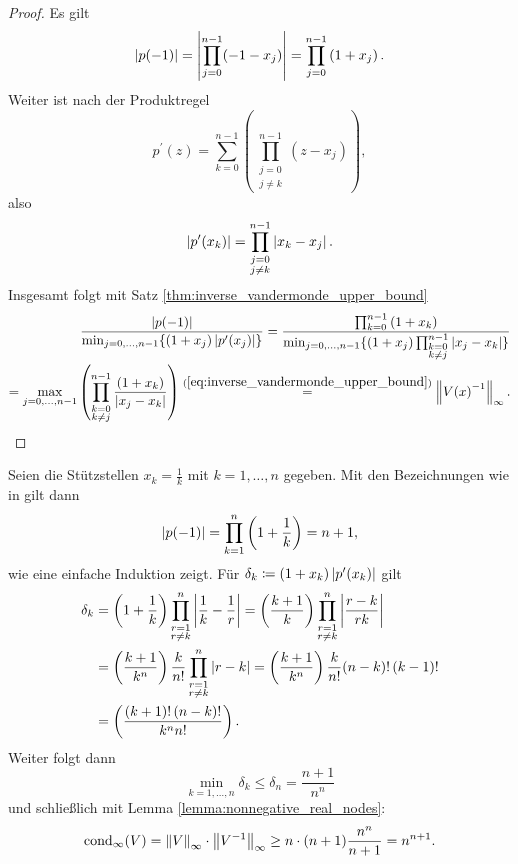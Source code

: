 \begin{proof}
    Es gilt
    \[
        \abs{p(-1)} = \abs{\prod_{j=0}^{n-1} (-1 - x_j)} = \prod_{j=0}^{n-1} \left( 1 + x_j \right).
    \]
    Weiter ist nach der Produktregel
    \[
        p^{\prime}(z) = \sum_{k=0}^{n-1} \left( \prod_{\substack{j=0\\ j\neq k}}^{n-1} \left( z - x_j \right) \right),
    \]
    also
    \[
        \abs{p^{\prime}(x_k)} = \prod_{\substack{j=0\\ j\neq k}}^{n-1} \abs{ x_k - x_j }.
    \]
    Insgesamt folgt mit Satz \ref{thm:inverse_vandermonde_upper_bound}
    \[
        \begin{split}
            \frac{ \abs{p(-1)}}{\min_{j=0, \dots, n-1} \{ (1+x_j) \abs{p^{\prime}(x_j)} \}}
            = \frac{\prod_{k=0}^{n-1} \left( 1 + x_k \right)}{\min_{j=0, \dots, n-1} \{ (1+x_j) \prod_{\substack{k=0\\ k\neq j}}^{n-1} \abs{ x_j - x_k }\}}\\
            = \max_{j=0, \dots, n-1} \left( \prod_{\substack{k=0\\ k \neq j}}^{n-1} \frac{\left( 1 + x_k \right)}{\abs{ x_j - x_k }} \right)
            \overset{(\ref{eq:inverse_vandermonde_upper_bound})}{=} \norm{\Vand{x}^{-1}}_{\infty}.
        \end{split}
    \]
\end{proof}

\begin{example}
    Seien die Stützstellen $x_k = \frac{1}{k}$ mit $k=1, \dots, n$ gegeben.
    Mit den Bezeichnungen wie in  gilt dann
    \[
        \abs{p(-1)} = \prod_{k=1}^{n} \left( 1 + \frac{1}{k} \right) = n+1,
    \]
    wie eine einfache Induktion zeigt.
    Für $\delta_k \defeq (1 + x_k) \abs{ p^{\prime}(x_k) }$ gilt
    \[
        \begin{split}
            \delta_k &= \left( 1 + \frac{1}{k} \right) \prod_{\substack{r = 1\\ r\neq k}}^n \abs{ \frac{1}{k} - \frac{1}{r} }
                     = \left( \frac{k+1}{k} \right) \prod_{\substack{r = 1\\ r\neq k}}^n \abs{ \frac{r-k}{rk}}\\
                     &= \left( \frac{k+1}{k^n} \right) \frac{k}{n!} \prod_{\substack{r = 1\\ r\neq k}}^n \abs{ r-k }
                     = \left( \frac{k+1}{k^n} \right) \frac{k}{n!} (n-k)! \, (k-1)!\\
                     &= \left( \frac{(k+1)! \, (n-k)!}{k^n n!} \right).
        \end{split}
    \]
    Weiter folgt dann
    \[
        \min_{k=1, \dots, n} \delta_k \leq \delta_n = \frac{n+1}{n^n}
    \]
    und schließlich mit Lemma \ref{lemma:nonnegative_real_nodes}:
    \[
        \cond[\infty]{V} = \norm{V}_\infty \cdot \norm{V^{-1}}_\infty \geq n \cdot (n+1) \frac{n^n}{n+1} = n^{n+1}.
    \]
\end{example}

